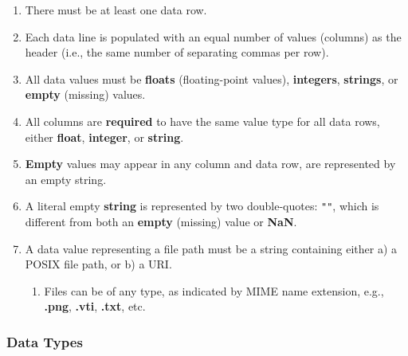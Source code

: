 \begin{enumerate}
\begin{enumerate}
    \item There must be at least one data row.
    \item Each data line is populated with an equal number of values
          (columns) as the header (i.e., the same number of separating commas 
          per row).
    \item All data values must be \textbf{floats} (floating-point values), 
          \textbf{integers}, \textbf{strings}, or \textbf{empty} (missing) 
          values.
    \item All columns are \textbf{required} to have the same value type for
          all data rows, either \textbf{float}, \textbf{integer}, or 
          \textbf{string}.
    \item \textbf{Empty} values may appear in any column and data row, are represented by an empty string.  
    \item A literal empty \textbf{string} is represented by two double-quotes: 
          \texttt{""}, which is different from both an \textbf{empty} (missing) 
          value or \textbf{NaN}. 
    \item A data value representing a file path must be a string containing either 
          a) a POSIX file path, or b) a URI.
    \begin{enumerate}
    \item Files can be of any type, as indicated by MIME name extension, e.g., 
          \textbf{.png}, \textbf{.vti}, \textbf{.txt}, etc.
    \end{enumerate}
\end{enumerate}
\end{enumerate}

\subsubsection{Data Types}

